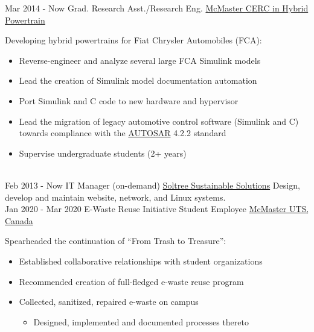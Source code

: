 \documentclass[letterpaper]{twentysecondcv} %
\begin{document}
\vspace{-.5em}
\begin{twenty} %
  \twentyitem
  {Mar 2014 -}
  {Now}
  {Grad. Research Asst./Research Eng.}
  {%
    \href{http://hybrid.mcmaster.ca/}{McMaster CERC in Hybrid Powertrain}}
  {}
  {Developing hybrid powertrains for Fiat Chrysler Automobiles (FCA):
    \begin{itemize}
      \item Reverse-engineer and analyze several large FCA Simulink models
      \item Lead the creation of Simulink model documentation automation
      \item Port Simulink and C code to new hardware and hypervisor
      \item Lead the migration of legacy automotive control software (Simulink and C) towards compliance with the \href{https://www.autosar.org/standards/classic-platform/}{AUTOSAR} 4.2.2 standard
      \item Supervise undergraduate students (2+ years)
    \end{itemize}}
  \\
  \twentyitem
  {Feb 2013 -}
  {Now}
  {IT Manager (on-demand)}
  {\href{http://www.soltree.net/}{Soltree Sustainable Solutions}}
  {}
  {Design, develop and maintain website, network, and Linux systems.}
	\\
  \twentyitem
  {Jan 2020 -}
  {Mar 2020}
  {E-Waste Reuse Initiative Student Employee}
  {\href{https://uts.mcmaster.ca/}{McMaster UTS, Canada}}
  {}
  {Spearheaded the continuation of ``From Trash to Treasure'':
    \begin{itemize}
      \item Established collaborative relationships with student organizations
      \item Recommended creation of full-fledged e-waste reuse program
      \item Collected, sanitized, repaired e-waste on campus
      \begin{itemize}
        \item Designed, implemented and documented processes thereto

\end{itemize}
\end{itemize}}
\end{twenty}
\end{document}
